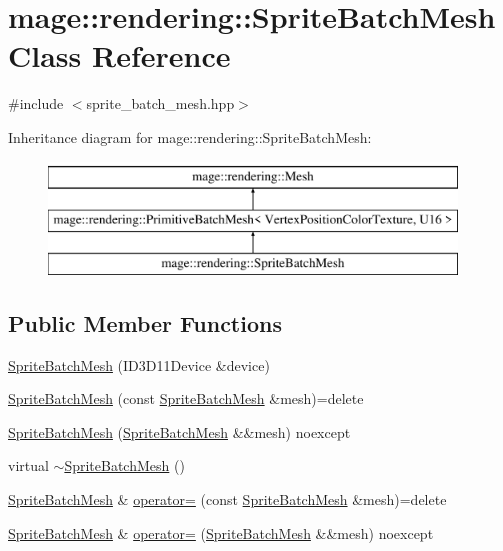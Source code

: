 \hypertarget{classmage_1_1rendering_1_1_sprite_batch_mesh}{}\section{mage\+:\+:rendering\+:\+:Sprite\+Batch\+Mesh Class Reference}
\label{classmage_1_1rendering_1_1_sprite_batch_mesh}


{\ttfamily \#include $<$sprite\+\_\+batch\+\_\+mesh.\+hpp$>$}

Inheritance diagram for mage\+:\+:rendering\+:\+:Sprite\+Batch\+Mesh\+:\begin{figure}[H]
\begin{center}
\leavevmode
\includegraphics[height=3.000000cm]{classmage_1_1rendering_1_1_sprite_batch_mesh}
\end{center}
\end{figure}
\subsection*{Public Member Functions}
\begin{DoxyCompactItemize}
\item 
\mbox{\hyperlink{classmage_1_1rendering_1_1_sprite_batch_mesh_a992adb566fc9718869f0c6e6f1391df7}{Sprite\+Batch\+Mesh}} (I\+D3\+D11\+Device \&device)
\item 
\mbox{\hyperlink{classmage_1_1rendering_1_1_sprite_batch_mesh_a961b1df4f0e0b8dc17f968a5e61c2ce6}{Sprite\+Batch\+Mesh}} (const \mbox{\hyperlink{classmage_1_1rendering_1_1_sprite_batch_mesh}{Sprite\+Batch\+Mesh}} \&mesh)=delete
\item 
\mbox{\hyperlink{classmage_1_1rendering_1_1_sprite_batch_mesh_af36ff5857269d512b8d6799d1121599d}{Sprite\+Batch\+Mesh}} (\mbox{\hyperlink{classmage_1_1rendering_1_1_sprite_batch_mesh}{Sprite\+Batch\+Mesh}} \&\&mesh) noexcept
\item 
virtual \mbox{\hyperlink{classmage_1_1rendering_1_1_sprite_batch_mesh_a3228406dcd17c971ab84e2565c547d8c}{$\sim$\+Sprite\+Batch\+Mesh}} ()
\item 
\mbox{\hyperlink{classmage_1_1rendering_1_1_sprite_batch_mesh}{Sprite\+Batch\+Mesh}} \& \mbox{\hyperlink{classmage_1_1rendering_1_1_sprite_batch_mesh_a7855038d3367c62dcbb2d3227cdb5c81}{operator=}} (const \mbox{\hyperlink{classmage_1_1rendering_1_1_sprite_batch_mesh}{Sprite\+Batch\+Mesh}} \&mesh)=delete
\item 
\mbox{\hyperlink{classmage_1_1rendering_1_1_sprite_batch_mesh}{Sprite\+Batch\+Mesh}} \& \mbox{\hyperlink{classmage_1_1rendering_1_1_sprite_batch_mesh_a9ab382cdbdb112391eb857e139f6399a}{operator=}} (\mbox{\hyperlink{classmage_1_1rendering_1_1_sprite_batch_mesh}{Sprite\+Batch\+Mesh}} \&\&mesh) noexcept
\end{DoxyCompactItemize}

